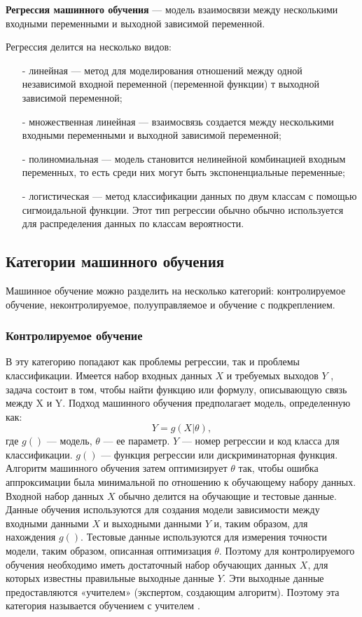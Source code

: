 \textbf{Регрессия машинного обучения} --- модель взаимосвязи между несколькими входными переменными и выходной зависимой переменной.

Регрессия делится на несколько видов:
\begin{itemize}
	\item[-] линейная --- метод для моделирования отношений между одной независимой входной переменной (переменной функции) т выходной зависимой переменной;
	\item[-] множественная линейная --- взаимосвязь создается между несколькими входными переменными и выходной зависимой переменной;
	\item[-] полиномиальная --- модель становится нелинейной комбинацией входным переменных, то есть среди них могут быть экспоненциальные переменные;
	\item[-] логистическая --- метод классификации данных по двум классам с помощью сигмоидальной функции. Этот тип регрессии обычно обычно используется для распределения данных по классам вероятности.
\end{itemize}

\subsection{Категории машинного обучения}

Машинное обучение можно разделить на несколько категорий: контролируемое обучение, неконтролируемое, полууправляемое и обучение с подкреплением.

\subsubsection{Контролируемое обучение}

В эту категорию попадают как проблемы регрессии, так и проблемы классификации. Имеется набор входных данных $X$ и требуемых выходов $Y$ , задача состоит в том, чтобы найти функцию или формулу, описывающую связь между X и Y. Подход машинного обучения предполагает модель, определенную как:
\begin{equation}
	Y = g(X | \theta),
\end{equation}
где $g()$ — модель, $\theta$ — ее параметр. $Y$ — номер регрессии и код класса для классификации. $g()$ — функция регрессии или дискриминаторная функция. Алгоритм машинного обучения затем оптимизирует $\theta$ так, чтобы ошибка аппроксимации была минимальной по отношению к обучающему набору данных. Входной набор данных $X$ обычно делится на обучающие и тестовые данные. Данные обучения используются для создания модели зависимости между входными данными $X$ и выходными данными $Y$ и, таким образом, для нахождения $g()$. Тестовые данные используются для измерения точности модели, таким образом, описанная оптимизация $\theta$. Поэтому для контролируемого обучения необходимо иметь достаточный набор обучающих данных $X$, для которых известны правильные выходные данные $Y$. Эти выходные данные предоставляются «учителем» (экспертом, создающим алгоритм). Поэтому эта категория называется обучением с учителем \cite{artificialintel}.

